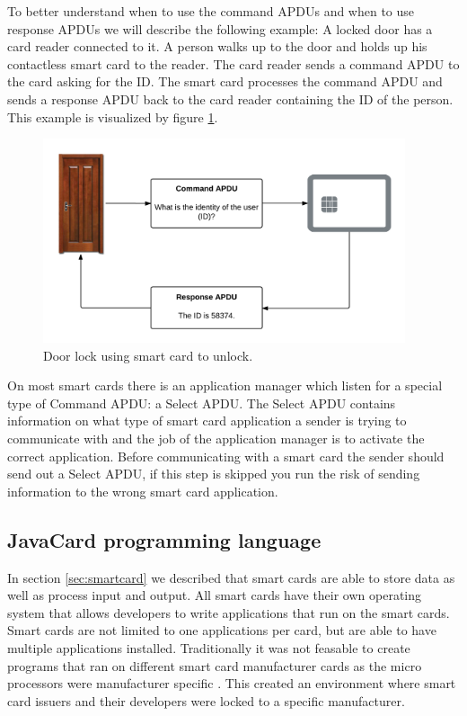 To better understand when to use the command APDUs and when to use response APDUs we will describe the following example: A locked door has a card reader connected to it. A person walks up to the door and holds up his contactless smart card to the reader. The card reader sends a command APDU to the card asking for the ID. The smart card processes the command APDU and sends a response APDU back to the card reader containing the ID of the person. This example is visualized by figure \ref{fig:doornfc}.

\begin{figure}[h!]
  \caption{Door lock using smart card to unlock.}
  \label{fig:doornfc}
  \centering
    \includegraphics[width=0.95\textwidth]{images/doornfc.png}
\end{figure}

On most smart cards there is an application manager which listen for a special type of Command APDU: a Select APDU. The Select APDU contains information on what type of smart card application a sender is trying to communicate with and the job of the application manager is to activate the correct application. Before communicating with a smart card the sender should send out a Select APDU, if this step is skipped you run the risk of sending information to the wrong smart card application.

\subsection{JavaCard programming language}
\label{sec:javacard}
In section \ref{sec:smartcard} we described that smart cards are able to store data as well as process input and output. All smart cards have their own operating system that allows developers to write applications that run on the smart cards. Smart cards are not limited to one applications per card, but are able to have multiple applications installed. Traditionally it was not feasable to create programs that ran on different smart card manufacturer cards as the micro processors were manufacturer specific \cite{javacardapplet}. This created an environment where smart card issuers and their developers were locked to a specific manufacturer.

